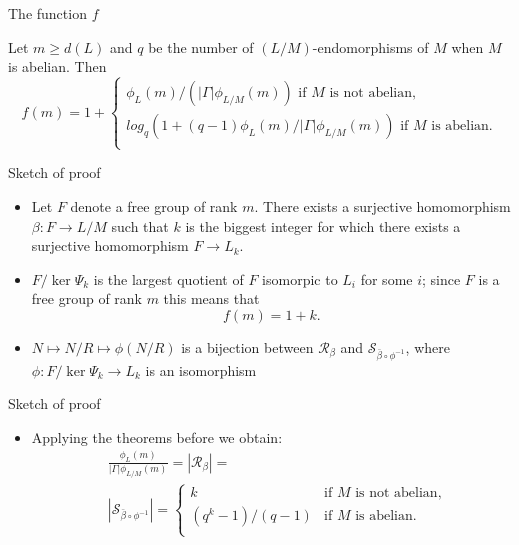 \documentclass{beamer}
\newcommand{\card}[1]{| #1 |}
\begin{document}
\begin{frame}{The function $f$}
    \begin{theorem}
        Let $m \ge d(L)$ and $q$ be the number of $(L/M)$-endomorphisms of $M$ when $M$ is abelian. Then 
        $$
        f(m) = 1 +
        \begin{cases}
            \phi_L(m)/(\card{\Gamma}\phi_{L/M}(m))  \text{ if } M \text{ is not abelian,} \\
            log_q(1+(q-1)\phi_L(m)/\card{\Gamma}\phi_{L/M}(m))  \text{ if } M \text{ is abelian.} \\
        \end{cases}
        $$
    \end{theorem}
\end{frame}

\begin{frame}{Sketch of proof}
    \begin{itemize}
        \item Let $F$ denote a free group of rank $m$. There exists a surjective homomorphism $\beta \colon F \rightarrow L/M$ such that $k$ is the biggest integer for which there exists a surjective homomorphism $F \rightarrow L_k$.
        \item<2-> $F/\ker{\Psi_k}$ is the largest quotient of $F$ isomorpic to $L_i$ for some $i$; since $F$ is a free group of rank $m$ this means that 
        $$
        f(m) = 1 + k.
        $$
        \item<3-> $N \mapsto N/R \mapsto \phi(N/R)$ is a bijection between $\mathscr{R}_\beta$ and $\mathscr{S}_{\bar{\beta} \circ \phi^{-1}}$, where $\phi \colon F/\ker{\Psi_k} \rightarrow L_k$ is an isomorphism
    \end{itemize}
\end{frame}

\begin{frame}{Sketch of proof}
    \begin{itemize}
        \item Applying the theorems before we obtain:
        \begin{align*}
            &\frac{\phi_L(m)}{\card{\Gamma}\phi_{L/M}(m)} = \card{\mathscr{R}_\beta} = \\
            & \card{\mathscr{S}_{\bar{\beta} \circ \phi^{-1}}} = 
        \begin{cases}
            k & \text{if } M \text{ is not abelian,} \\
            (q^k-1)/(q-1) & \text{if } M \text{ is abelian.} \\
        \end{cases}
        \end{align*}
    \end{itemize}
\end{frame}
\end{document}
